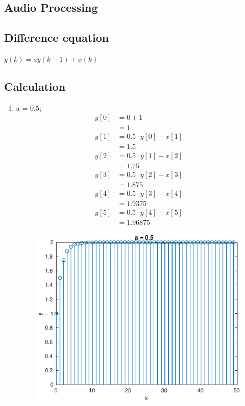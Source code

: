 \documentclass{article}
\begin{document}
\begin{multicols*}{2}
     \section{Audio Processing}
     \subsection{Difference equation}
     \(y(k) = a y(k-1) + x(k)\)
     \subsection{Calculation}
     \begin{enumerate}
          \item a = 0.5; \begin{align*}
                     y[0] & = 0 + 1                 \\
                          & = 1                     \\
                     y[1] & = 0.5 \cdot y[0] + x[1] \\
                          & = 1.5                   \\
                     y[2] & = 0.5 \cdot y[1] + x[2] \\
                          & = 1.75                  \\
                     y[3] & = 0.5 \cdot y[2] + x[3] \\
                          & = 1.875                 \\
                     y[4] & = 0.5 \cdot y[3] + x[4] \\
                          & = 1.9375                \\
                     y[5] & = 0.5 \cdot y[4] + x[5] \\
                          & = 1.96875
                \end{align*}
                \begin{figure}[H]
                     \centering
                     \includegraphics[width=\linewidth]{a5}

\end{figure}
\end{enumerate}
\end{multicols*}
\end{document}
